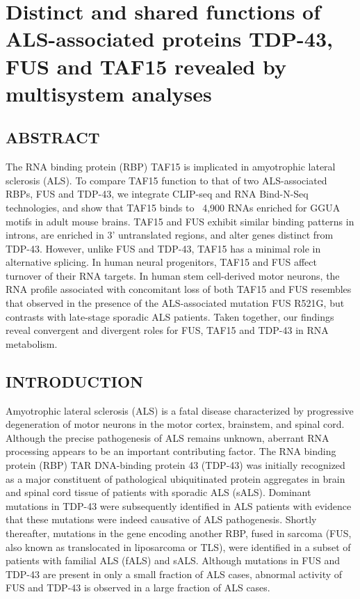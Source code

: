 \chapter{Distinct and shared functions of ALS-associated proteins TDP-43, FUS and TAF15 revealed by multisystem analyses}

\section{ABSTRACT}

The RNA binding protein (RBP) TAF15 is implicated in amyotrophic lateral sclerosis (ALS). To compare TAF15 function to that of two ALS-associated RBPs, FUS and TDP-43, we integrate CLIP-seq and RNA Bind-N-Seq technologies, and show that TAF15 binds to ~4,900 RNAs enriched for GGUA motifs in adult mouse brains. TAF15 and FUS exhibit similar binding patterns in introns, are enriched in 3’ untranslated regions, and alter genes distinct from TDP-43. However, unlike FUS and TDP-43, TAF15 has a minimal role in alternative splicing. In human neural progenitors, TAF15 and FUS affect turnover of their RNA targets. In human stem cell-derived motor neurons, the RNA profile associated with concomitant loss of both TAF15 and FUS resembles that observed in the presence of the ALS-associated mutation FUS R521G, but contrasts with late-stage sporadic ALS patients. Taken together, our findings reveal convergent and divergent roles for FUS, TAF15 and TDP-43 in RNA metabolism.
 
\section{INTRODUCTION}
Amyotrophic lateral sclerosis (ALS) is a fatal disease characterized by progressive degeneration of motor neurons in the motor cortex, brainstem, and spinal cord. Although the precise pathogenesis of ALS remains unknown, aberrant RNA processing appears to be an important contributing factor. The RNA binding protein (RBP) TAR DNA-binding protein 43 (TDP-43) was initially recognized as a major constituent of pathological ubiquitinated protein aggregates in brain and spinal cord tissue of patients with sporadic ALS (sALS)\cite{Arai2006,Neumann2006a}. Dominant mutations in TDP-43 were subsequently identified in ALS patients\cite{Corrado2009,Daoud2009,DelBo2009,Kuhnlein2008,Lemmens2009,Rutherford2008} with evidence that these mutations were indeed causative of ALS pathogenesis\cite{Sreedharan2008}. Shortly thereafter, mutations in the gene encoding another RBP, fused in sarcoma (FUS, also known as translocated in liposarcoma or TLS), were identified in a subset of patients with familial ALS (fALS) and sALS\cite{Vance2009,Kwiatkowski2009}. Although mutations in FUS and TDP-43 are present in only a small fraction of ALS cases, abnormal activity of FUS and TDP-43 is observed in a large fraction of ALS cases.


